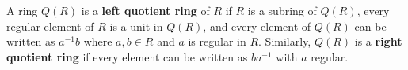 A ring $Q(R)$ is a \textbf{left quotient ring} of $R$ if $R$ is a subring of $Q(R)$, every regular element of $R$ is a unit in $Q(R)$, and every element of $Q(R)$ can be written as $a^{-1}b$ where $a,b \in R$ and $a$ is regular in $R$. Similarly, $Q(R)$ is a \textbf{right quotient ring} if every element can be written as $ba^{-1}$ with $a$ regular.
